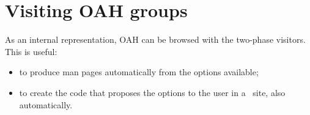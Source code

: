 \section{Visiting OAH groups}

As an internal representation, OAH can be browsed with the two-phase visitors. This is useful:
\begin{itemize}
\item to produce man pages automatically from the options available;
\item to create the code that proposes the options to the user in a \Web\ site, also automatically.
\end{itemize}



